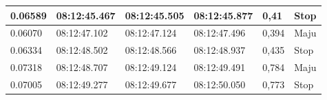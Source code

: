 \begin{longtable}{|l|l|l|l|l|l|}
  0.06589                                                                                                 & 08:12:45.467                                                                                           & 08:12:45.505                                                                                               & 08:12:45.877                                                                                            & 0,41                                               & Stop                                              \\ \hline
  0.06070                                                                                                 & 08:12:47.102                                                                                           & 08:12:47.124                                                                                               & 08:12:47.496                                                                                            & 0,394                                              & Maju                                              \\ \hline
  0.06334                                                                                                 & 08:12:48.502                                                                                           & 08:12:48.566                                                                                               & 08:12:48.937                                                                                            & 0,435                                              & Stop                                              \\ \hline
  0.07318                                                                                                 & 08:12:48.707                                                                                           & 08:12:49.124                                                                                               & 08:12:49.491                                                                                            & 0,784                                              & Maju                                              \\ \hline
  0.07005                                                                                                 & 08:12:49.277                                                                                           & 08:12:49.677                                                                                               & 08:12:50.050                                                                                            & 0,773                                              & Stop                                              \\ \hline

\end{longtable}
